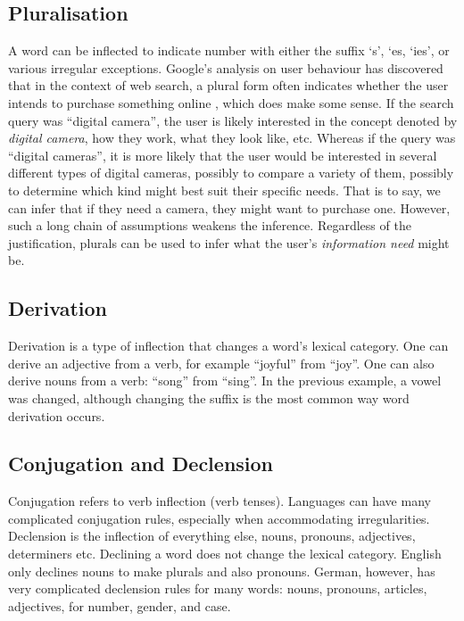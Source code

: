 \subsection{Pluralisation}
A word can be inflected to indicate number with either the suffix `s', `es, `ies', or various irregular exceptions. Google's analysis on user behaviour has discovered that in the context of web search, a plural form often indicates whether the user intends to purchase something online \cite{david2006google}, which does make some sense. If the search query was ``digital camera'', the user is likely interested in the concept denoted by \textit{digital camera}, how they work, what they look like, etc. Whereas if the query was ``digital cameras'', it is more likely that the user would be interested in several different types of digital cameras, possibly to compare a variety of them, possibly to determine which kind might best suit their specific needs. That is to say, we can infer that if they need a camera, they might want to purchase one. However, such a long chain of assumptions weakens the inference. Regardless of the justification, plurals can be used to infer what the user's \textit{information need} might be.






\subsection{Derivation}
Derivation is a type of inflection that changes a word's lexical category. One can derive an adjective from a verb, for example ``joyful'' from ``joy''. One can also derive nouns from a verb: ``song'' from ``sing''. In the previous example, a vowel was changed, although changing the suffix is the most common way word derivation occurs.

\subsection{Conjugation and Declension}
Conjugation refers to verb inflection (verb tenses). Languages can have many complicated conjugation rules, especially when accommodating irregularities. Declension is the inflection of everything else, nouns, pronouns, adjectives, determiners etc. Declining a word does not change the lexical category. English only declines nouns to make plurals and also pronouns. German, however, has very complicated declension rules for many words: nouns, pronouns, articles, adjectives, for number, gender, and case.

